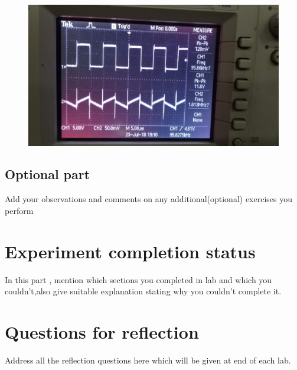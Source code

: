 \documentclass[12pt]{article}
\begin{document}
\begin{figure}
\centering
\includegraphics[scale = 0.08]{ac-coupling.jpg}
\end{figure}
\begin{figure}[h]
\centering



\end{figure}
\newpage
\subsection{Optional part }

Add your observations and comments on any additional(optional) exercises you perform


\section{Experiment completion status}
In this part , mention which sections you completed in lab and which you couldn't,also give suitable explanation stating why you couldn't complete it.

\section{Questions for reflection}
Address all the reflection questions here which will be given at end of each lab.
  
\end{document}
